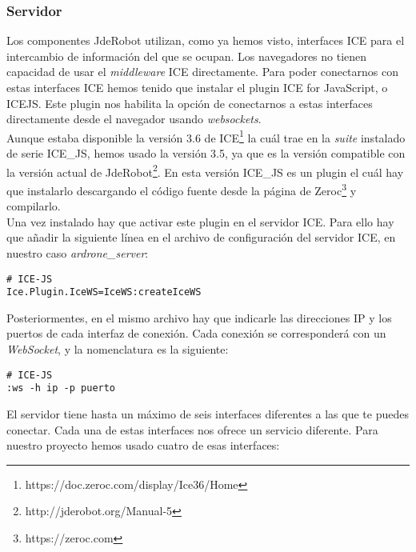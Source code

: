 \subsubsection{Servidor}

Los componentes JdeRobot utilizan, como ya hemos visto, interfaces ICE para el intercambio de información del que se ocupan. Los navegadores no tienen capacidad de usar el \emph{middleware} ICE directamente. Para poder conectarnos con estas interfaces ICE hemos tenido que instalar el plugin ICE for JavaScript, o ICE\-JS. Este plugin nos habilita la opción de conectarnos a estas interfaces directamente desde el navegador usando \emph{websockets}.\\

Aunque estaba disponible la versión 3.6 de ICE\footnote{https://doc.zeroc.com/display/Ice36/Home} la cuál trae en la \emph{suite} instalado de serie ICE\_JS, hemos usado la versión 3.5, ya que es la versión compatible con la versión actual de JdeRobot\footnote{http://jderobot.org/Manual-5}. En esta versión ICE\_JS es un plugin el cuál hay que instalarlo descargando el código fuente desde la página de Zeroc\footnote{https://zeroc.com} y compilarlo.\\

Una vez instalado hay que activar este plugin en el servidor ICE. Para ello hay que añadir la siguiente línea en el archivo de configuración del servidor ICE, en nuestro caso \emph{ardrone\_server}:\\

\begin{lstlisting}[caption=Activación del plugin ICEJS]
# ICE-JS
Ice.Plugin.IceWS=IceWS:createIceWS
\end{lstlisting}

Posteriormentes, en el mismo archivo hay que indicarle las direcciones IP y los puertos de cada interfaz de conexión. Cada conexión se corresponderá con un \emph{WebSocket}, y la nomenclatura es la siguiente:\\

\begin{lstlisting}[caption=Formato \emph{endpoints} de los \emph{WebSocket} de ICEJS]
# ICE-JS
:ws -h ip -p puerto
\end{lstlisting}


El servidor tiene hasta un máximo de seis interfaces diferentes a las que te puedes conectar. Cada una de estas interfaces nos ofrece un servicio diferente. Para nuestro proyecto hemos usado cuatro de esas interfaces:\\

